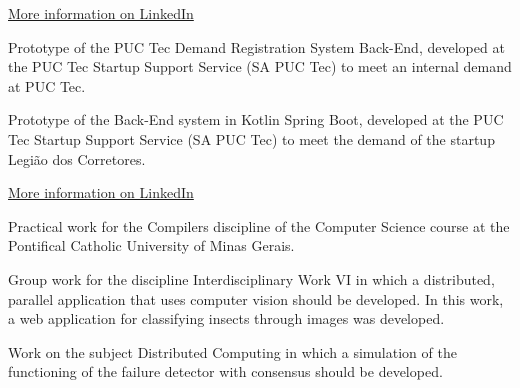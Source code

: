 \documentclass[10pt,a4paper,ragged2e,withhyper]{altacv}
\begin{document}
\begin{paracol}{2}
            {\large\color{emphasis}\href{https://www.linkedin.com/in/henriquemcc/details/projects/}{More information on LinkedIn}}
        

            Prototype of the PUC Tec Demand Registration System Back-End, developed at the PUC Tec Startup Support Service (SA PUC Tec) to meet an internal demand at PUC Tec.\\
            \divider

            Prototype of the Back-End system in Kotlin Spring Boot, developed at the PUC Tec Startup Support Service (SA PUC Tec) to meet the demand of the startup Legião dos Corretores.\\
            \divider

            {\large\color{emphasis}\href{https://www.linkedin.com/in/henriquemcc/details/projects/}{More information on LinkedIn}}
        

            Practical work for the Compilers discipline of the Computer Science course at the Pontifical Catholic University of Minas Gerais.\\
            \divider

            Group work for the discipline Interdisciplinary Work VI in which a distributed, parallel application that uses computer vision should be developed. In this work, a web application for classifying insects through images was developed.\\
            \divider

            Work on the subject Distributed Computing in which a simulation of the functioning of the failure detector with consensus should be developed.\\
            \divider


\end{paracol}
\end{document}
